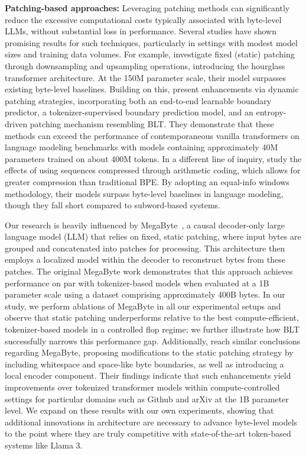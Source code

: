 \textbf{Patching-based approaches:} Leveraging patching methods can significantly reduce the excessive computational costs typically associated with byte-level LLMs, without substantial loss in performance. Several studies have shown promising results for such techniques, particularly in settings with modest model sizes and training data volumes. For example, \cite{nawrot-etal-2022-hierarchical} investigate fixed (static) patching through downsampling and upsampling operations, introducing the hourglass transformer architecture. At the 150M parameter scale, their model surpasses existing byte-level baselines. Building on this, \cite{nawrot-etal-2023-efficient} present enhancements via dynamic patching strategies, incorporating both an end-to-end learnable boundary predictor, a tokenizer-supervised boundary prediction model, and an entropy-driven patching mechanism resembling {\textsc BLT}. They demonstrate that these methods can exceed the performance of contemporaneous vanilla transformers on language modeling benchmarks with models containing approximately 40M parameters trained on about 400M tokens. In a different line of inquiry, \cite{lester2024training} study the effects of using sequences compressed through arithmetic coding, which allows for greater compression than traditional BPE. By adopting an equal-info windows methodology, their models surpass byte-level baselines in language modeling, though they fall short compared to subword-based systems.

Our research is heavily influenced by MegaByte~\citep{yu2023megabyte}, a causal decoder-only large language model (LLM) that relies on fixed, static patching, where input bytes are grouped and concatenated into patches for processing. This architecture then employs a localized model within the decoder to reconstruct bytes from these patches. The original MegaByte work demonstrates that this approach achieves performance on par with tokenizer-based models when evaluated at a 1B parameter scale using a dataset comprising approximately 400B bytes. In our study, we perform ablations of MegaByte in all our experimental setups and observe that static patching underperforms relative to the best compute-efficient, tokenizer-based models in a controlled flop regime; we further illustrate how {\textsc BLT} successfully narrows this performance gap. Additionally, \cite{slagle2024spacebyte} reach similar conclusions regarding MegaByte, proposing modifications to the static patching strategy by including whitespace and space-like byte boundaries, as well as introducing a local encoder component. Their findings indicate that such enhancements yield improvements over tokenized transformer models within compute-controlled settings for particular domains such as Github and arXiv at the 1B parameter level. We expand on these results with our own experiments, showing that additional innovations in architecture are necessary to advance byte-level models to the point where they are truly competitive with state-of-the-art token-based systems like Llama 3.

